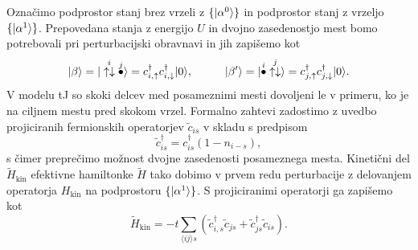 \documentclass[10pt,a4paper]{article}
\begin{document}
Označimo podprostor stanj brez vrzeli z $\{ \vert\alpha^0\rangle\}$ in podprostor stanj z vrzeljo $\{ \vert\alpha^1\rangle\}$.
Prepovedana stanja z energijo $U$ in dvojno zasedenostjo mest bomo potrebovali pri perturbacijski obravnavi in jih zapišemo  kot 
\begin{equation}\label{eq:vzbujena}
\ket{\beta}=\ket{ \overset{i}{\uparrow\downarrow}\overset{j}{\bullet}}=c^\dagger_{i,\uparrow}c^\dagger_{i,\downarrow}\ket{0}, \hspace{10mm} 
\ket{\beta'}=\ket{\overset{i}{\bullet}\overset{j}{\uparrow\downarrow}}=c^\dagger_{j,\uparrow}c^\dagger_{j,\downarrow}\ket{0}.
\end{equation}
 V modelu tJ so skoki delcev med posameznimi mesti dovoljeni le v primeru, ko je na ciljnem mestu pred skokom vrzel. Formalno zahtevi zadostimo z uvedbo projiciranih fermionskih operatorjev $\tilde{c}_{is}$ v skladu s predpisom 
\begin{equation}\label{eq:projicirani}
\tilde{c}^\dagger_{is}= c^\dagger_{is} \left(1-n_{i-s}\right),
\end{equation}
s čimer preprečimo možnost dvojne zasedenosti posameznega mesta. Kinetični del $\tilde{H}_\mathrm{kin}$ efektivne hamiltonke $\tilde{H}$ tako dobimo v prvem redu perturbacije z delovanjem operatorja $H_\mathrm{kin}$ na podprostoru $\{ \vert\alpha^1\rangle \}$. S projiciranimi operatorji ga zapišemo kot 
\begin{equation}\label{eq:ef_kin}
\tilde{H}_\mathrm{kin}=-t\sum\limits_{\langle ij \rangle s} \left(\tilde{c}^\dagger_{i,s} \tilde{c}_{js} + \tilde{c}^\dagger_{js}\tilde{c}_{is}\right).
\end{equation}
\end{document}

